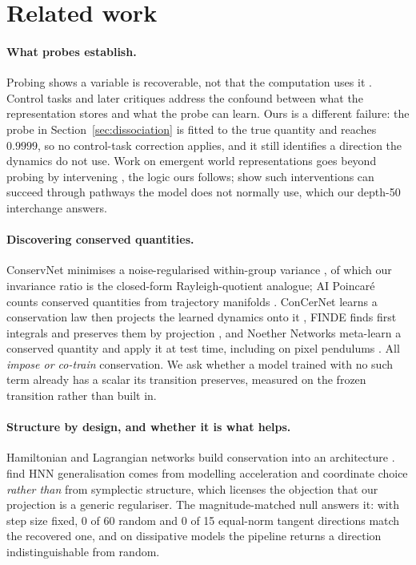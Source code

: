 \section{Related work}
\label{sec:related}

\paragraph{What probes establish.}
Probing shows a variable is recoverable, not that the computation uses it \citep{alain2017probing}.
Control tasks \citep{hewitt2019control} and later critiques \citep{belinkov2022probing} address the
confound between what the representation stores and what the probe can learn. Ours is a different
failure: the probe in Section~\ref{sec:dissociation} is fitted to the true quantity and reaches
$0.9999$, so no control-task correction applies, and it still identifies a direction the dynamics do
not use. Work on emergent world representations goes beyond probing by intervening
\citep{li2023othello,nanda2023othello}, the logic ours follows; \citet{makelov2024illusion} show such
interventions can succeed through pathways the model does not normally use, which our depth-50
interchange answers.

\paragraph{Discovering conserved quantities.}
ConservNet minimises a noise-regularised within-group variance \citep{ha2021conservnet}, of which our
invariance ratio is the closed-form Rayleigh-quotient analogue; AI Poincar\'e counts conserved
quantities from trajectory manifolds \citep{liu2021aipoincare}. ConCerNet learns a conservation law
then projects the learned dynamics onto it \citep{zhang2023concernet}, FINDE finds first integrals and
preserves them by projection \citep{matsubara2023finde}, and Noether Networks meta-learn a conserved
quantity and apply it at test time, including on pixel pendulums \citep{alet2021noether}. All
\emph{impose or co-train} conservation. We ask whether a model trained with no such term already has
a scalar its transition preserves, measured on the frozen transition rather than built in.

\paragraph{Structure by design, and whether it is what helps.}
Hamiltonian and Lagrangian networks build conservation into an architecture
\citep{greydanus2019hnn,cranmer2020lnn}. \citet{gruver2022deconstructing} find HNN generalisation
comes from modelling acceleration and coordinate choice \emph{rather than} from symplectic structure,
which licenses the objection that our projection is a generic regulariser. The magnitude-matched null
answers it: with step size fixed, 0 of 60 random and 0 of 15 equal-norm tangent directions match the
recovered one, and on dissipative models the pipeline returns a direction indistinguishable from
random.

